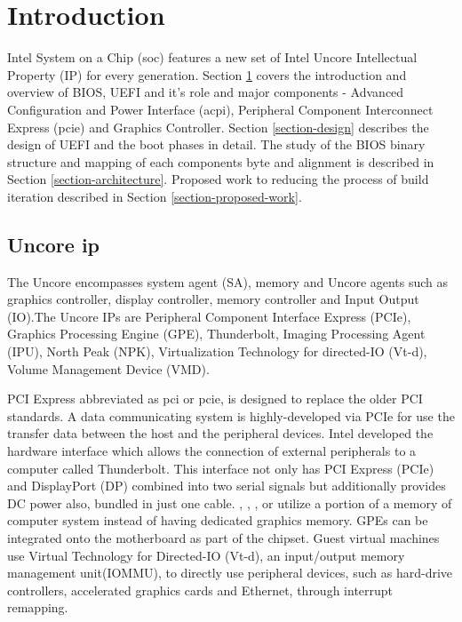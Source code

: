 \section{Introduction}\label{section-introduction}
Intel System on a Chip (\gls{soc}) features a new set of Intel Uncore Intellectual Property (IP) for every generation.
Section \ref{section-introduction} covers the introduction and overview of BIOS, UEFI and it's role and major components - Advanced Configuration and Power Interface (\gls{acpi}), Peripheral Component Interconnect Express (\gls{pcie}) and Graphics Controller. Section \ref{section-design} describes the design of UEFI and the boot phases in detail. The study of the BIOS binary structure and mapping of each components byte and alignment is described in Section \ref{section-architecture}. Proposed work to reducing the process of build iteration described in Section \ref{section-proposed-work}. 

\subsection{Uncore \gls{ip}}
The Uncore encompasses system agent (SA), memory and Uncore agents such as graphics controller, display controller, memory controller and Input Output (IO).The Uncore IPs are Peripheral Component Interface Express (PCIe), Graphics Processing Engine (GPE), Thunderbolt, Imaging Processing Agent (IPU), North Peak (NPK), Virtualization Technology for directed-IO (Vt-d), Volume Management Device (VMD).

PCI Express abbreviated as \gls{pci} or \gls{pcie}, is designed to replace the older PCI standards. A data communicating system is highly-developed via PCIe for use the transfer data between the host and the peripheral devices. Intel developed the hardware interface which allows the connection of external peripherals to a computer called Thunderbolt. This interface not only has PCI Express (PCIe) and DisplayPort (DP) combined into two serial signals but additionally provides DC power also, bundled in just one cable.
, , ,  or  utilize a portion of a memory of computer system instead of having dedicated graphics memory.
GPEs can be integrated onto the motherboard as part of the chipset. Guest virtual machines use Virtual Technology for Directed-IO (Vt-d), an input/output memory management unit(IOMMU), to directly use peripheral devices, such as hard-drive controllers, accelerated graphics cards and Ethernet, through interrupt remapping.

